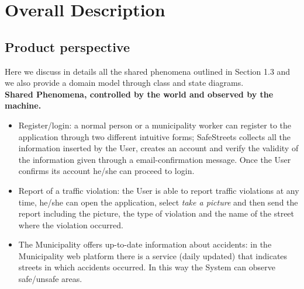 \section{Overall Description}

\subsection{Product
perspective}
Here we discuss in details all the shared phenomena outlined in Section 1.3 and we also provide a domain model through class and state diagrams.
\\\newline
    \noindent\textbf{Shared Phenomena, controlled by the world and observed by the machine. }
\begin{itemize}
    \item Register/login: a normal person or a municipality worker can register to the application through two different intuitive forms; SafeStreets collects all the information inserted by the User, creates an account and verify the validity of the information given through a email-confirmation message. Once the User confirms its account he/she can proceed to login.
    \item Report of a traffic violation: the User is able to report traffic violations at any time, he/she can open the application, select \textit{take a picture} and then send the report including the picture, the type of violation and the name of the street where the violation occurred.
    \item The Municipality offers up-to-date information about accidents: in the Municipality web platform there is a service (daily updated) that indicates streets in which accidents occurred. In this way the System can observe safe/unsafe areas.
\end{itemize}

